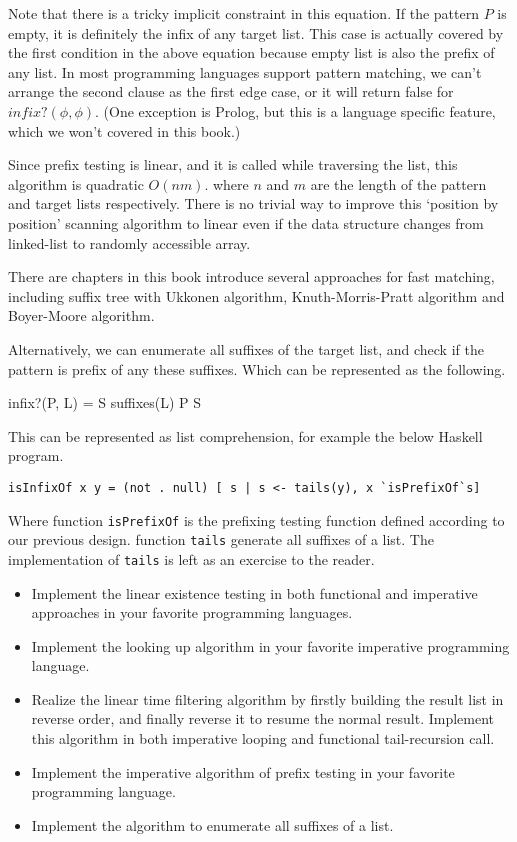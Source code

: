 \documentclass[UTF8]{article}
\begin{document}
Note that there is a tricky implicit constraint in this equation. If the pattern $P$ is empty,
it is definitely the infix of any target list. This case is actually covered by the first condition
in the above equation because empty list is also the prefix of any list. In most programming languages
support pattern matching, we can't arrange the second clause as the first edge case, or it will
return false for $infix?(\phi, \phi)$. (One exception is Prolog, but this is a language specific
feature, which we won't covered in this book.)

Since prefix testing is linear, and it is called while traversing the list, this algorithm
is quadratic $O(nm)$. where $n$ and $m$ are the length of the pattern and target lists respectively.
There is no trivial way to improve this `position by position' scanning algorithm to linear
even if the data structure changes from linked-list to randomly accessible array.

There are chapters in this book introduce several approaches for fast matching, including
suffix tree with Ukkonen algorithm, Knuth-Morris-Pratt algorithm and Boyer-Moore algorithm.

Alternatively, we can enumerate all suffixes of the target list, and check if the pattern
is prefix of any these suffixes. Which can be represented as the following.

\be
infix?(P, L) = \exists S \in suffixes(L) \land P \subseteq S
\ee

This can be represented as list comprehension, for example the below Haskell program.

\lstset{language=Haskell}
\begin{lstlisting}
isInfixOf x y = (not . null) [ s | s <- tails(y), x `isPrefixOf`s]
\end{lstlisting}

Where function \verb|isPrefixOf| is the prefixing testing function defined according to
our previous design. function \verb|tails| generate all suffixes of a list. The implementation
of \verb|tails| is left as an exercise to the reader.

\begin{Exercise}
\begin{itemize}
\item Implement the linear existence testing in both functional and imperative approaches in
your favorite programming languages.
\item Implement the looking up algorithm in your favorite imperative programming language.
\item Realize the linear time filtering algorithm by firstly building the result list in reverse
order, and finally reverse it to resume the normal result. Implement this algorithm in both
imperative looping and functional tail-recursion call.
\item Implement the imperative algorithm of prefix testing in your favorite programming language.
\item Implement the algorithm to enumerate all suffixes of a list.
\end{itemize}
\end{Exercise}
\end{document}
